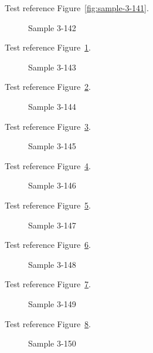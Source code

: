 Test reference Figure~\ref{fig:sample-3-141}.

\begin{figure}[tbhp]
\caption{Sample 3-142}
\label{fig:sample-3-142}
\end{figure}

Test reference Figure~\ref{fig:sample-3-142}.

\begin{figure}[tbhp]
\caption{Sample 3-143}
\label{fig:sample-3-143}
\end{figure}

Test reference Figure~\ref{fig:sample-3-143}.

\begin{figure}[tbhp]
\caption{Sample 3-144}
\label{fig:sample-3-144}
\end{figure}

Test reference Figure~\ref{fig:sample-3-144}.

\begin{figure}[tbhp]
\caption{Sample 3-145}
\label{fig:sample-3-145}
\end{figure}

Test reference Figure~\ref{fig:sample-3-145}.

\begin{figure}[tbhp]
\caption{Sample 3-146}
\label{fig:sample-3-146}
\end{figure}

Test reference Figure~\ref{fig:sample-3-146}.

\begin{figure}[tbhp]
\caption{Sample 3-147}
\label{fig:sample-3-147}
\end{figure}

Test reference Figure~\ref{fig:sample-3-147}.

\begin{figure}[tbhp]
\caption{Sample 3-148}
\label{fig:sample-3-148}
\end{figure}

Test reference Figure~\ref{fig:sample-3-148}.

\begin{figure}[tbhp]
\caption{Sample 3-149}
\label{fig:sample-3-149}
\end{figure}

Test reference Figure~\ref{fig:sample-3-149}.

\begin{figure}[tbhp]
\caption{Sample 3-150}
\label{fig:sample-3-150}
\end{figure}

